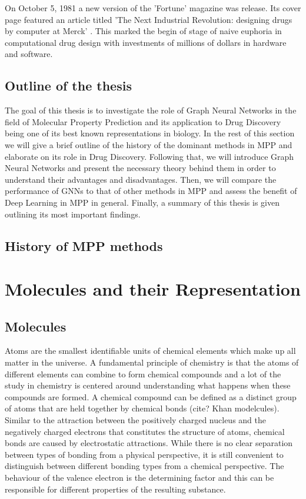On October 5, 1981 a new version of the 'Fortune' magazine was release. Its cover page featured an article titled 'The   Next Industrial  Revolution:  designing  drugs  by  computer  at Merck' \cite{article}. This marked the begin of stage of naive euphoria in computational drug design with investments of millions of dollars in hardware and software. 
\subsection{Outline of the thesis}
The goal of this thesis is to investigate the role of Graph Neural Networks in the field of Molecular Property Prediction and its application to Drug Discovery being one of its best known representations in biology. In the rest of this section we will give a brief outline of the history of the dominant methods in MPP and elaborate on its role in Drug Discovery. Following that, we will introduce Graph Neural Networks and present the necessary theory behind them in order to understand their advantages and disadvantages. Then, we will compare the performance of GNNs to that of other methods in MPP and assess the benefit of Deep Learning in MPP in general. Finally, a summary of this thesis is given outlining its most important findings. 
\subsection{History of MPP methods}

\section{Molecules and their Representation}



\subsection{Molecules}
Atoms are the smallest identifiable units of chemical elements which make up all matter in the universe. A fundamental principle of chemistry is that the atoms of different elements can combine to form chemical compounds and a lot of the study in chemistry is centered around understanding what happens when these compounds are formed. A chemical compound can be defined as a distinct group of atoms that are held together by chemical bonds (cite? Khan modelcules). Similar to the attraction between the positively charged nucleus and the negatively charged electrons that constitutes the structure of atoms, chemical bonds are caused by electrostatic attractions. While there is no clear separation between types of bonding from a physical perspective, it is still convenient to distinguish between different bonding types from a chemical perspective. The behaviour of the valence electron is the determining factor and this can be responsible for different properties of the resulting substance.

